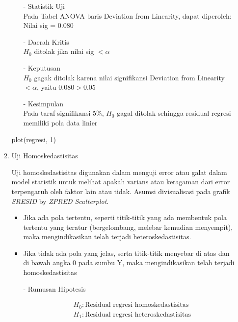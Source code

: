 \begin{enumerate}
\begin{enumerate}
\begin{test}
{\begin{enumerate}
            \item[-] Statistik Uji \\
            Pada Tabel ANOVA baris Deviation from Linearity, dapat diperoleh: \\
            Nilai sig = 0.080
        
            \item[-] Daerah Kritis \\
            $H_0$ ditolak jika nilai sig $< \alpha$
        
            \item[-] Keputusan \\
            $H_0$ gagak ditolak karena nilai signifikansi Deviation from Linearity $< \alpha$, yaitu $0.080 > 0.05$
        
            \item[-] Kesimpulan \\
            Pada taraf signifikansi 5\%, $H_0$ gagal ditolak sehingga residual regresi memiliki pola data linier
        \end{enumerate}
        }
plot(regresi, 1)
        \end{test}

    \item Uji Homoskedastisitas \\
    \begin{sloppypar}
    Uji homoskedastisitas digunakan dalam menguji error atau galat dalam model statistik untuk melihat apakah varians atau keragaman dari error terpengaruh oleh faktor lain atau tidak. Asumsi divisualisasi pada grafik \textit{SRESID} by \textit{ZPRED Scatterplot}.
    \begin{itemize}
    \item Jika ada pola tertentu, seperti titik-titik yang ada membentuk pola tertentu yang teratur (bergelombang, melebar kemudian menyempit), maka mengindikasikan telah terjadi heteroskedastisitas.  
    \item Jika tidak ada pola yang jelas, serta titik-titik menyebar di atas dan di bawah angka 0 pada sumbu Y, maka mengindikasikan telah terjadi homoskedastisitas
    \end{itemize}
    \end{sloppypar}
        \begin{test}{
            \begin{enumerate}
            \item[-] Rumusan Hipotesis \\
            \begin{fleqn}[\parindent]
                \begin{equation*}
                \begin{split}
                &H_0 : \text{Residual regresi homoskedastisitas} \\ 
                &H_1 : \text{Residual regresi heteroskedastisitas} \\
                \end{split}
                \end{equation*}
            \end{fleqn}
        

\end{enumerate}}
\end{test}
\end{enumerate}
\end{enumerate}
